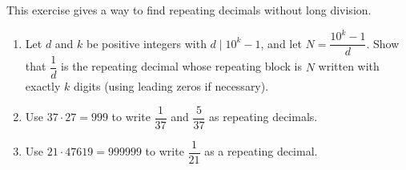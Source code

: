 This exercise gives a way to find repeating decimals without long division.
\begin{enumerate}
\item[(a)] Let $d$ and $k$ be positive integers with $d\mid10^k-1$, and let $N=\dfrac{10^k-1}{d}$. Show that $\dfrac1d$ is the repeating decimal whose repeating block is $N$ written with exactly $k$ digits (using leading zeros if necessary).
\item[(b)] Use $37\cdot27=999$ to write $\dfrac{1}{37}$ and $\dfrac{5}{37}$ as repeating decimals.
\item[(c)] Use $21\cdot47619=999999$ to write $\dfrac{1}{21}$ as a repeating decimal.
\end{enumerate}
